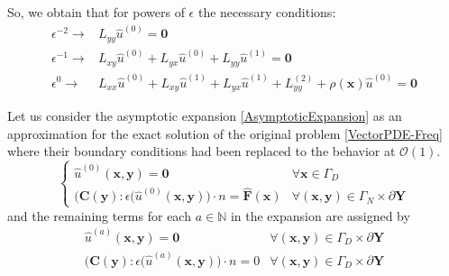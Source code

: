 So, we obtain that for powers of $\epsilon$ the necessary conditions:
\begin{equation}
    \label{Epsilon-Separation}
    \begin{array}{cc}
        \epsilon^{-2} \longrightarrow & L_{yy} \hat{u}^{(0)} = \mathbf{0} \\
        \epsilon^{-1} \longrightarrow & L_{xy}\hat{u}^{(0)} + L_{yx}\hat{u}^{(0)} + L_{yy}\hat{u}^{(1)} = \mathbf{0} \\
        \epsilon^{0} \longrightarrow & L_{xx}\hat{u}^{(0)} + L_{xy} \hat{u}^{(1)} + L_{yx}\hat{u}^{(1)} + L_{yy}^{(2)} + \rho(\mathbf{x}) \hat{u}^{(0)} = \mathbf{0}
    \end{array}
\end{equation}

Let us consider the asymptotic expansion \ref{AsymptoticExpansion} as an approximation for the exact solution of the original problem \ref{VectorPDE-Freq} where their boundary conditions had been replaced to the behavior at $\mathcal{O}(1)$.
\begin{equation*}
    \left \{
    \begin{array}{cc}   
        \hat{u}^{(0)}(\mathbf{x},\mathbf{y}) = \mathbf{0} & \forall \mathbf{x} \in \Gamma_D\\
        \big(\mathbf{C}(\mathbf{y}): \epsilon (\hat{u}^{(0)}(\mathbf{x}, \mathbf{y}) \big) \cdot n = \hat{\mathbf{F}}(\mathbf{x}) & \forall (\mathbf{x},\mathbf{y}) \in \Gamma_N \times \partial \mathbf{Y}
    \end{array}
    \right .
\end{equation*}
and the remaining terms for each $a \in \mathbb{N}$ in the expansion are assigned by
\begin{equation*}
    \begin{array}{cc}
        \hat{u}^{(a)}(\mathbf{x},\mathbf{y}) = \mathbf{0} & \forall (\mathbf{x}, \mathbf{y}) \in \Gamma_D\times \partial \mathbf{Y} \\
        \big( \mathbf{C}(\mathbf{y}): \epsilon(\hat{u}^{(a)}(\mathbf{x},\mathbf{y}) \big) \cdot n = 0 & \forall  (\mathbf{x}, \mathbf{y}) \in \Gamma_D\times \partial \mathbf{Y} 
    \end{array}
\end{equation*}

